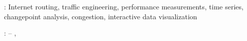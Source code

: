\thispagestyle{empty}

\hfill

\vfill
\noindent \textbf{}: Internet routing, traffic engineering, performance measurements, time series, changepoint analysis, congestion, interactive data visualization \\ \medskip

\noindent\textbf{\myName}: \myTitle -- \textit{\mySubtitle}, %
\textcopyright\ \myTime

%
%
%
%
%
